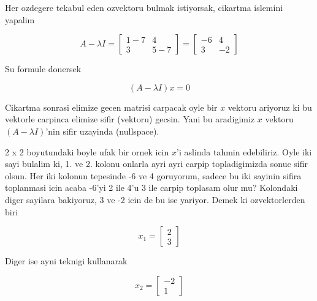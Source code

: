 \documentclass[12pt,fleqn]{article}\usepackage{../common}
\begin{document}
Her ozdegere tekabul eden ozvektoru bulmak istiyorsak, cikartma islemini
yapalim

\[ 
A - \lambda I = 
\left[\begin{array}{rr}
1-7 & 4 \\ 3 & 5-7
\end{array}\right] = 
\left[\begin{array}{rr}
-6 & 4 \\ 3 & -2
\end{array}\right]
 \]

Su formule donersek

\[ (A - \lambda I) x = 0 \]

Cikartma sonrasi elimize gecen matrisi carpacak oyle bir $x$ vektoru
ariyoruz ki bu vektorle carpinca elimize sifir (vektoru) gecsin. Yani bu
aradigimiz $x$ vektoru $(A - \lambda I)$'nin sifir uzayinda (nullspace). 

2 x 2 boyutundaki boyle ufak bir ornek icin $x$'i aslinda tahmin
edebiliriz. Oyle iki sayi bulalim ki, 1. ve 2. kolonu onlarla ayri ayri
carpip topladigimizda sonuc sifir olsun. Her iki kolonun tepesinde -6 ve 4
goruyorum, sadece bu iki sayinin sifira toplanmasi icin acaba -6'yi 2 ile
4'u 3 ile carpip toplasam olur mu? Kolondaki diger sayilara bakiyoruz, 3 ve
-2 icin de bu ise yariyor. Demek ki ozvektorlerden biri 

\[ x_1 = 
\left[\begin{array}{r}
2 \\ 3
\end{array}\right]
 \]

Diger ise ayni teknigi kullanarak

\[ x_2 = 
\left[\begin{array}{r}
-2 \\ 1
\end{array}\right]
 \]
\end{document}
